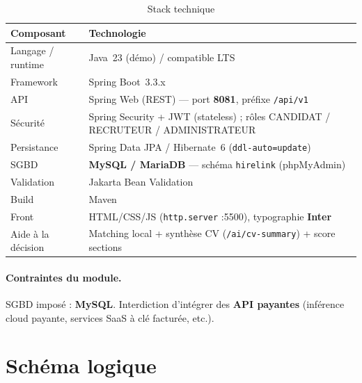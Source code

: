 \documentclass[12pt,a4paper,oneside]{report}
\begin{document}
\begin{table}[H]
\centering
\caption{Stack technique}
\begin{tabular}{@{}ll@{}}
\toprule
\textbf{Composant} & \textbf{Technologie} \\
\midrule
Langage / runtime & Java~23 (démo) / compatible LTS \\
Framework & Spring Boot~3.3.x \\
API & Spring Web (REST) --- port \textbf{8081}, préfixe \texttt{/api/v1} \\
Sécurité & Spring Security + JWT (stateless) ; rôles CANDIDAT / RECRUTEUR / ADMINISTRATEUR \\
Persistance & Spring Data JPA / Hibernate~6 (\texttt{ddl-auto=update}) \\
SGBD & \textbf{MySQL / MariaDB} --- schéma \texttt{hirelink} (phpMyAdmin) \\
Validation & Jakarta Bean Validation \\
Build & Maven \\
Front & HTML/CSS/JS (\texttt{http.server} :5500), typographie \textbf{Inter} \\
Aide à la décision & Matching local + synthèse CV (\texttt{/ai/cv-summary}) + score sections \\
\bottomrule
\end{tabular}
\end{table}

\paragraph{Contraintes du module.}
SGBD imposé : \textbf{MySQL}. Interdiction d'intégrer des \textbf{API payantes} (inférence cloud payante, services SaaS à clé facturée, etc.).

\section{Schéma logique}

\begin{center}
\end{center}
\end{document}
